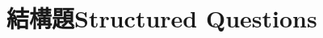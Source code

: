 \documentclass[class=exam, crop=false]{standalone}
\newif\ifitsquestion
\begin{document}
\setlength{\tabcolsep}{10pt}

\section*{結構題Structured Questions}
\begin{questions}
    \toggletrue{isitlq}
\end{questions}

\end{document}
